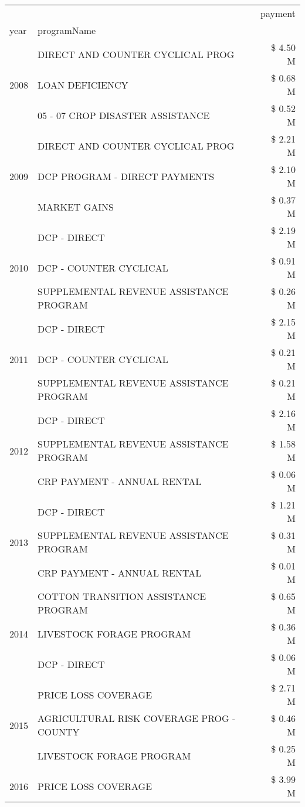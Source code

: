 \begin{tabular}{llr}
\toprule
 &  & payment \\
year & programName &  \\
\midrule
\multirow[t]{3}{*}{2008} & DIRECT AND COUNTER CYCLICAL PROG & \$ 4.50 M \\
 & LOAN DEFICIENCY & \$ 0.68 M \\
 & 05 - 07 CROP DISASTER ASSISTANCE & \$ 0.52 M \\
\cline{1-3}
\multirow[t]{3}{*}{2009} & DIRECT AND COUNTER CYCLICAL PROG & \$ 2.21 M \\
 & DCP PROGRAM - DIRECT PAYMENTS & \$ 2.10 M \\
 & MARKET GAINS & \$ 0.37 M \\
\cline{1-3}
\multirow[t]{3}{*}{2010} & DCP - DIRECT & \$ 2.19 M \\
 & DCP - COUNTER CYCLICAL & \$ 0.91 M \\
 & SUPPLEMENTAL REVENUE ASSISTANCE PROGRAM & \$ 0.26 M \\
\cline{1-3}
\multirow[t]{3}{*}{2011} & DCP - DIRECT & \$ 2.15 M \\
 & DCP - COUNTER CYCLICAL & \$ 0.21 M \\
 & SUPPLEMENTAL REVENUE ASSISTANCE PROGRAM & \$ 0.21 M \\
\cline{1-3}
\multirow[t]{3}{*}{2012} & DCP - DIRECT & \$ 2.16 M \\
 & SUPPLEMENTAL REVENUE ASSISTANCE PROGRAM & \$ 1.58 M \\
 & CRP PAYMENT - ANNUAL RENTAL & \$ 0.06 M \\
\cline{1-3}
\multirow[t]{3}{*}{2013} & DCP - DIRECT & \$ 1.21 M \\
 & SUPPLEMENTAL REVENUE ASSISTANCE PROGRAM & \$ 0.31 M \\
 & CRP PAYMENT - ANNUAL RENTAL & \$ 0.01 M \\
\cline{1-3}
\multirow[t]{3}{*}{2014} & COTTON TRANSITION ASSISTANCE PROGRAM & \$ 0.65 M \\
 & LIVESTOCK FORAGE PROGRAM & \$ 0.36 M \\
 & DCP - DIRECT & \$ 0.06 M \\
\cline{1-3}
\multirow[t]{3}{*}{2015} & PRICE LOSS COVERAGE & \$ 2.71 M \\
 & AGRICULTURAL RISK COVERAGE PROG - COUNTY & \$ 0.46 M \\
 & LIVESTOCK FORAGE PROGRAM & \$ 0.25 M \\
\cline{1-3}
\multirow[t]{3}{*}{2016} & PRICE LOSS COVERAGE & \$ 3.99 M \\

\end{tabular}
